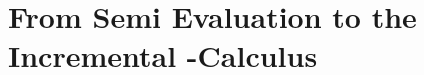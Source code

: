\section{From Semi\naive{} Evaluation to the Incremental \boldfn-Calculus}
\label{sec:seminaive-and-ilc}
